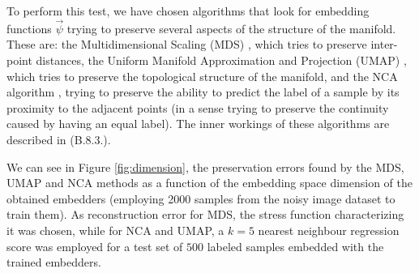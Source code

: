 \documentclass[11pt, a4paper, twoside]{article} %
\begin{document}
To perform this test, we have chosen algorithms that look for embedding functions $\vec{\psi}$ trying to preserve several aspects of the structure of the manifold. These are: the Multidimensional Scaling (MDS) \cite{MDS}, which tries to preserve inter-point distances, the Uniform Manifold Approximation and Projection (UMAP) \cite{umap}, which tries to preserve the topological structure of the manifold, and the NCA algorithm \cite{NCA}, trying to preserve the ability to predict the label of a sample by its proximity to the adjacent points (in a sense trying to preserve the continuity caused by having an equal label). The inner workings of these algorithms are described in (B.8.3.).



We can see in Figure \ref{fig:dimension}, the preservation errors found by the MDS, UMAP and NCA methods as a function of the embedding space dimension of the obtained embedders (employing 2000 samples from the noisy image dataset to train them). As reconstruction error for MDS, the stress function characterizing it was chosen, while for NCA and UMAP, a $k=5$ nearest neighbour regression score was employed for a test set of $500$ labeled samples embedded with the trained embedders.
\end{document}
